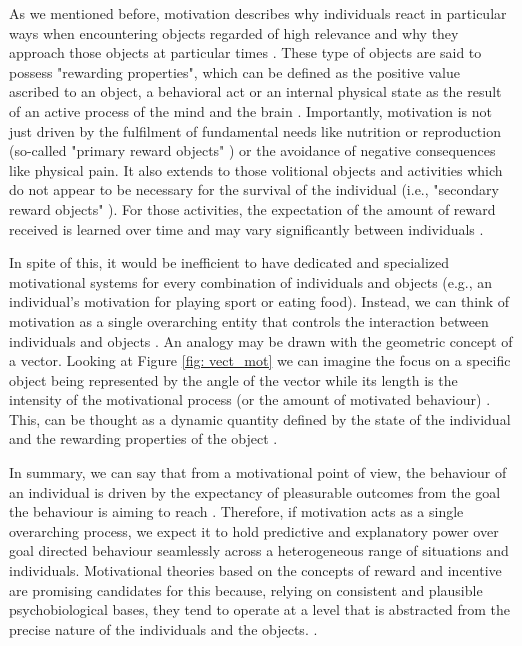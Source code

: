 As we mentioned before, motivation describes why individuals react in particular ways when encountering objects regarded of high relevance and why they approach those objects at particular times \cite{berridge2004motivation}. These type of objects are said to possess "rewarding properties", which can be defined as the positive value ascribed to an object, a behavioral act or an internal physical state as the result of an active process of the mind and the brain \cite{schultz1997neural,berridge2008affective}. Importantly, motivation is not just driven by the fulfilment of fundamental needs like nutrition or reproduction (so-called "primary reward objects" \cite{schultz2000reward}) or the avoidance of negative consequences like physical pain. It also extends to those volitional objects and activities which do not appear to be necessary for the survival of the individual (i.e., "secondary reward objects" \cite{berridge2008affective,sescousse2013processing}). For those activities, the expectation of the amount of reward received is learned over time and may vary significantly between individuals \cite{berridge2008affective,simpson2016behavioral}. 

In spite of this, it would be inefficient to have dedicated and specialized motivational systems for every combination of individuals and objects (e.g., an individual's motivation for playing sport or eating food). Instead, we can think of motivation as a single overarching entity that controls the interaction between individuals and objects  \cite{simpson2016behavioral}. An analogy may be drawn with the geometric concept of a vector. Looking at Figure \ref{fig: vect_mot} we can imagine the focus on a specific object being represented by the angle of the vector while its length is the intensity of the motivational process (or the amount of motivated behaviour) \cite{simpson2016behavioral}. This, can be thought as a dynamic quantity defined by the state of the individual and the rewarding properties of the object \cite{toates1994comparing,berridge2004motivation,zhang2009neural}.



In summary, we can say that from a motivational point of view, the behaviour of an individual is driven by the expectancy of pleasurable outcomes from the goal the behaviour is aiming to reach \cite{berridge2004motivation}. Therefore, if motivation acts as a single overarching process, we expect it to hold predictive and explanatory power over goal directed behaviour seamlessly across a heterogeneous range of situations and individuals. Motivational theories based on the concepts of reward and incentive are promising candidates for this because, relying on consistent and plausible psychobiological bases, they tend to operate at a level that is abstracted from the precise nature of the individuals and the objects. \cite{ikemoto1999role,berridge1998role,salamone2002motivational,berridge2004motivation,armony2013cambridge,corbit2015learning}.

